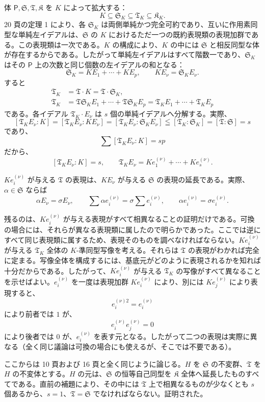 体 $\mathsf P,\mathfrak S,\mathfrak T,\mathfrak K$ を $K$ によって拡大する：
\[
K\subseteq \mathfrak S_K\subseteq \mathfrak T_K\subseteq \mathfrak K_K.
\]
20 頁の定理 1 により、各 $\mathfrak S_K$ は両側単純かつ完全可約であり、互いに作用素同型な単純左イデアルは、$\mathfrak S$ の $K$ におけるただ一つの既約表現類の表現加群である。この表現類は一次である。$K$ の構成により、$K$ の中には $\mathfrak S$ と相反同型な体が存在するからである。したがって単純左イデアルはすべて階数一であり、$\mathfrak S_K$ はその $\mathsf P$ 上の次数と同じ個数の左イデアルの和となる：
\[
\mathfrak S_K=K E_1+\cdots+K E_p,\qquad K E_\nu=\mathfrak S_K E_\nu.
\]
すると
\[
\begin{aligned}
\mathfrak T_K&=\mathfrak T\cdot K=\mathfrak T\cdot \mathfrak S_K,\\
\mathfrak T_K&=\mathfrak T\mathfrak S_K E_1+\cdots+\mathfrak T\mathfrak S_K E_p
              =\mathfrak T_K E_1+\cdots+\mathfrak T_K E_p
\end{aligned}
\]
である。各イデアル $\mathfrak T_K\cdot E_\nu$ は $s$ 個の単純イデアルへ分解する。実際、
\[
[\mathfrak T_K E_\nu:K]=[\mathfrak T_K E_\nu:K E_\nu]=[\mathfrak T_K E_\nu:\mathfrak S_K E_\nu]\leqq[\mathfrak T_K:\mathfrak S_K]=[\mathfrak T:\mathfrak S]=s
\]
であり、
\[
\sum [\mathfrak T_K E_\nu:K]=sp
\]
だから、
\[
[\mathfrak T_K E_\nu:K]=s,
\qquad
\mathfrak T_K E_\nu=K e_1^{(\nu)}+\cdots+K e_s^{(\nu)}.
\]

$K e_i^{(\nu)}$ が与える $\mathfrak T$ の表現は、$K E_\nu$ が与える $\mathfrak S$ の表現の延長である。実際、$\alpha\in\mathfrak S$ ならば
\[
\alpha E_\nu=\sigma E_\nu,\qquad
\sum \alpha e_i^{(\nu)}=\sigma\sum e_i^{(\nu)},\qquad
\alpha e_i^{(\nu)}=\sigma e_i^{(\nu)}.
\]

残るのは、$K e_i^{(\nu)}$ が与える表現がすべて相異なることの証明だけである。可換の場合には、それらが異なる表現類に属したので明らかであった。ここでは逆にすべて同じ表現類に属するため、表現そのものを調べなければならない。$K e_i^{(\nu)}$ が与える $\mathfrak T_K$ 全体の $K$-準同型写像を考える。それらは $\mathfrak T$ の表現がわかれば完全に定まる。写像全体を構成するには、基底元がどのように表現されるかを知れば十分だからである。したがって、$K e_i^{(\nu)}$ が与える $\mathfrak T_K$ の写像がすべて異なることを示せばよい。$e_i^{(\nu)}$ を一度は表現加群 $K e_i^{(\nu)}$ により、別には $K e_j^{(\nu)}$ により表現すると、
\[
e_i^{(\nu)2}=e_i^{(\nu)}
\]
により前者では $1$ が、
\[
e_i^{(\nu)}e_j^{(\nu)}=0
\]
により後者では $0$ が、$e_i^{(\nu)}$ を表す元となる。したがって二つの表現は実際に異なる（全く同じ議論は可換の場合にも使えるが、そこでは不要である）。

ここからは 10 頁および 16 頁と全く同じように論じる。$H$ を $\mathfrak S$ の不変群、$\mathfrak T$ を $H$ の不変体とする。$H$ の元は、$\mathfrak S$ の恒等自己同型を $\mathfrak K$ 全体へ延長したものすべてである。直前の補題により、その中には $\mathfrak T$ 上で相異なるものが少なくとも $s$ 個あるから、$s=1$、$\mathfrak T=\mathfrak S$ でなければならない。証明された。

